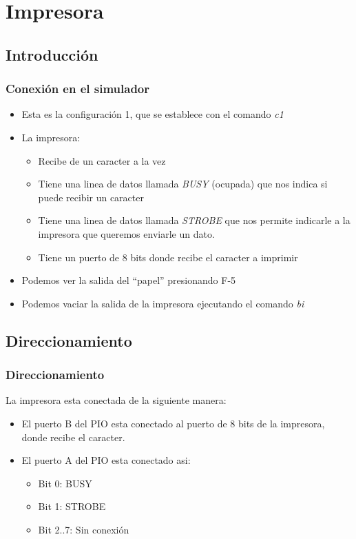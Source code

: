 \documentclass{beamer}
\begin{document}
\section{Impresora}
\subsection{Introducción}
\begin{frame}
\frametitle{Conexión en el simulador}
\begin{itemize}
  \item Esta es la configuración 1, que se establece con el comando \emph{c1}
  \item La impresora:
  \begin{itemize}
      \item Recibe de un caracter a la vez
      \item Tiene una linea de datos llamada \emph{BUSY} (ocupada) que nos indica si puede recibir un caracter
      \item Tiene una linea de datos llamada \emph{STROBE} que nos permite indicarle a la impresora que queremos enviarle un dato.
      \item Tiene un puerto de 8 bits donde recibe el caracter a imprimir
  \end{itemize}
 \item Podemos ver la salida del ``papel'' presionando F-5
 \item Podemos vaciar la salida de la impresora ejecutando el comando \emph{bi}
\end{itemize}
\end{frame}

\subsection{Direccionamiento}
\begin{frame}
\frametitle{Direccionamiento}
La impresora esta conectada de la siguiente manera:
\begin{itemize}
    \item El puerto B del PIO esta conectado al puerto de 8 bits de la impresora, donde recibe el caracter.
    \item El puerto A del PIO esta conectado asi:
\begin{itemize}
    \item Bit 0: BUSY
    \item Bit 1: STROBE
    \item Bit 2..7: Sin conexión
\end{itemize}
\end{itemize}
\end{frame}
\end{document}
